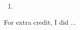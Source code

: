 \documentclass{article}
\begin{document}
\begin{enumerate}
\begin{enumerate}
            \begin{enumerate}[1.]
                \item
            \end{enumerate}

            For extra credit, I did ...
        \end{enumerate}
    \end{enumerate}
\end{document}
